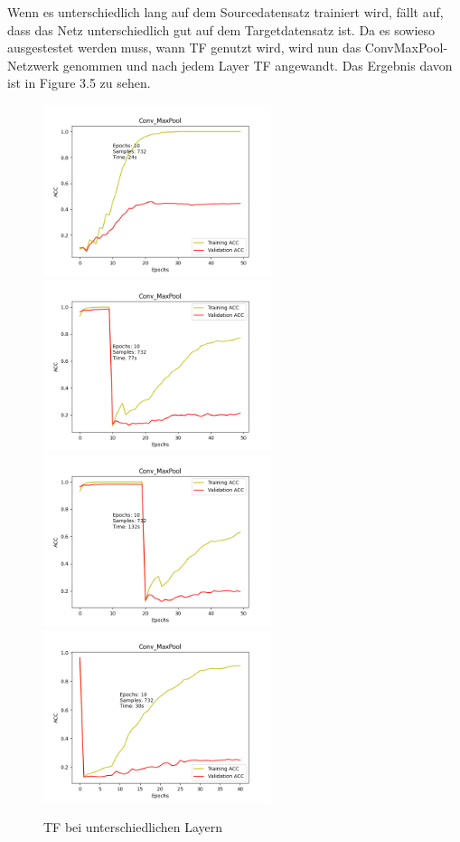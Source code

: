 Wenn es unterschiedlich lang auf dem Sourcedatensatz trainiert wird, fällt auf, dass das Netz unterschiedlich gut auf dem Targetdatensatz ist. 
Da es sowieso ausgestestet werden muss, wann TF genutzt wird, wird nun das ConvMaxPool-Netzwerk genommen und nach jedem Layer TF angewandt. 
Das Ergebnis davon ist in Figure 3.5 zu sehen. 

\begin{figure}[htpb]
    \includegraphics[height=5cm]{../../Plots/ba_plots/convmaxpool/wotr.png}
    \includegraphics[height=5cm]{../../Plots/ba_plots/convmaxpool/1TFtr.png}
    \includegraphics[height=5cm]{../../Plots/ba_plots/convmaxpool/2TFtr.png}
    \includegraphics[height=5cm]{../../Plots/ba_plots/convmaxpool/epochTFtr.png}
    \caption{\label{fig:layertf} TF bei unterschiedlichen Layern}
\end{figure}

